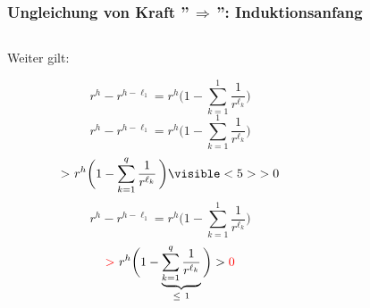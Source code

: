 \documentclass{beamer}
\begin{document}
\begin{frame}[t]
    \frametitle{Ungleichung von Kraft ''$\,\Longrightarrow\,$'': Induktionsanfang}
    \begin{columns}
    \begin{column}{0.5\textwidth}
        Weiter gilt:
        \begin{overprint}
            $$
                r^h - r^{h - \ell_1} = r^h\bigg(1 - \sum_{k=1}^{1} \frac{1}{r^{\ell_k}}\bigg)
            $$
            $$
                r^h - r^{h - \ell_1} = r^h\bigg(1 - \sum_{k=1}^{1} \frac{1}{r^{\ell_k}}\bigg)
            $$
            $$
                {>}\ r^h\bigg(1 - \sum_{k=1}^{q} \frac{1}{r^{\ell_k}}\,\bigg )\visible<5>{> 0}
            $$
            $$
                r^h - r^{h - \ell_1} = r^h\bigg(1 - \sum_{k=1}^{1} \frac{1}{r^{\ell_k}}\bigg)
            $$
            $$
                {\color{red} >}\ r^h\bigg(1 - \underbrace{\sum_{k=1}^{q} \frac{1}{r^{\ell_k}}}_{\leq\ 1}\bigg)
                > {\color{red}0}
            $$
        \end{overprint}
    \end{column}

        \begin{column}{0.55\textwidth}
        \onslide
            \begin{center}
\end{center}
\end{column}
\end{columns}
\end{frame}
\end{document}
